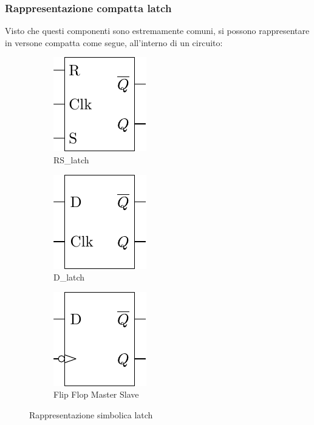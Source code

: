 \subsubsection*{Rappresentazione compatta latch}
Visto che questi componenti sono estremamente comuni, si possono rappresentare in versone compatta come segue, all'interno di un circuito:
\begin{figure}[H]
	\begin{center}
		\begin{subfigure}{0.3\textwidth}
			\begin{center}
				\includegraphics{Images/RS_latch_compatta.pdf}
				\caption{RS\_latch}
			\end{center}
		\end{subfigure}
		\begin{subfigure}{0.3\textwidth}
			\begin{center}
				\includegraphics{Images/D_latch_compatta.pdf}
				\caption{D\_latch}
			\end{center}
		\end{subfigure}
		\begin{subfigure}{0.3\textwidth}
			\begin{center}
				\includegraphics{Images/Flip_flop_master_slave.pdf}
				\caption{Flip Flop Master Slave}
			\end{center}
		\end{subfigure}
	\end{center}
	\caption{Rappresentazione simbolica latch}
\end{figure}
